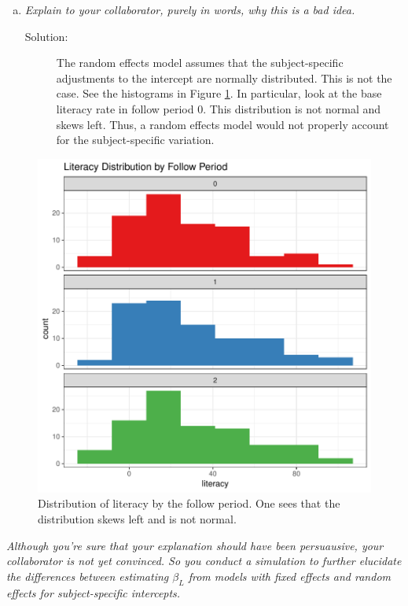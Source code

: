 \documentclass[11pt, letterpaper]{article}
\begin{document}
\begin{enumerate}[(a)]
\addtocounter{enumi}{1}
\item{\em Explain to your collaborator, purely in words, why this is a bad idea.}
  \begin{description}
  \item[Solution:] The random effects model assumes that the subject-specific
    adjustments to the intercept are normally distributed. This is not the
    case. See the histograms in Figure \ref{fig:literacy_by_follow_period}. In
    particular, look at the base literacy rate in follow period 0. This
    distribution is not normal and skews left. Thus, a random effects model
    would not properly account for the subject-specific variation.
  \end{description}
\end{enumerate}

\begin{figure}
  \centering
  \includegraphics{literacy_by_follow_period.pdf}
  \caption{Distribution of literacy by the follow period. One sees that the
    distribution skews left and is not normal.}
  \label{fig:literacy_by_follow_period}
\end{figure}

{\em Although you're sure that your explanation should have been persuausive, your collaborator is not yet convinced.  So you conduct a simulation to 
further elucidate the differences between estimating $\beta_L$ from models with
fixed effects and random effects for subject-specific intercepts.  }
\end{document}
